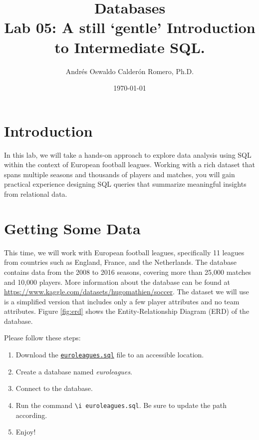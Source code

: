 \documentclass{article}
\title{Databases \\ Lab 05: A still `gentle' Introduction to Intermediate SQL.}
\author{Andrés Oswaldo Calderón Romero, Ph.D.}
\date{\today}
\begin{document}
\maketitle

\section{Introduction}
In this lab, we will take a hands-on approach to explore data analysis using SQL within the context of European football leagues. Working with a rich dataset that spans multiple seasons and thousands of players and matches, you will gain practical experience designing SQL queries that summarize meaningful insights from relational data.

\section{Getting Some Data}
This time, we will work with European football leagues, specifically 11 leagues from countries such as England, France, and the Netherlands. The database contains data from the 2008 to 2016 seasons, covering more than 25,000 matches and 10,000 players.
More information about the database can be found at \url{https://www.kaggle.com/datasets/hugomathien/soccer}. The dataset we will use is a simplified version that includes only a few player attributes and no team attributes. Figure \ref{fig:erd} shows the Entity-Relationship Diagram (ERD) of the database.

Please follow these steps:

\begin{enumerate}
    \item Download the \href{https://drive.google.com/file/d/17LjylJBOfWug6y0iEgjciztVPHpv82OT/view?usp=sharing}{\texttt{euroleagues.sql}} file to an accessible location.
    \item Create a database named \textit{euroleagues}.
    \item Connect to the database.
    \item Run the command \texttt{\textbackslash{}i euroleagues.sql}. Be sure to update the path according.
    \item Enjoy!
\end{enumerate}
\end{document}
